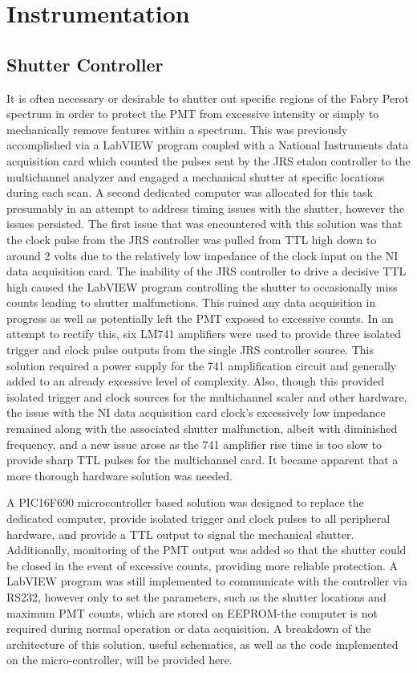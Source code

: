 \chapter{Instrumentation}
\section{Shutter Controller}\label{sec:Shutter}
It is often necessary or desirable to shutter out specific regions of the Fabry Perot spectrum in order to protect the PMT from excessive intensity or simply to mechanically remove features within a spectrum.  This was previously accomplished via a LabVIEW program coupled with a National Instruments data acquisition card which counted the pulses sent by the JRS etalon controller to the multichannel analyzer and engaged a mechanical shutter at specific locations during each scan.  A second dedicated computer was allocated for this task presumably in an attempt to address timing issues with the shutter, however the issues persisted.  The first issue that was encountered with this solution was that the clock pulse from the JRS controller was pulled from TTL high down to around 2 volts due to the relatively low impedance of the clock input on the NI data acquisition card.  The inability of the JRS controller to drive a decisive TTL high caused the LabVIEW program controlling the shutter to occasionally miss counts leading to shutter malfunctions.  This ruined any data acquisition in progress as well as potentially left the PMT exposed to excessive counts.  In an attempt to rectify this, six LM741 amplifiers were used to provide three isolated trigger and clock pulse outputs from the single JRS controller source.  This solution required a power supply for the 741 amplification circuit and generally added to an already excessive level of complexity.  Also, though this provided isolated trigger and clock sources for the multichannel scaler and other hardware, the issue with the NI data acquisition card clock's excessively low impedance remained along with the associated shutter malfunction, albeit with diminished frequency, and a new issue arose as the 741 amplifier rise time is too slow to provide sharp TTL pulses for the multichannel card.   It became apparent that a more thorough hardware solution was needed. 

A PIC16F690 microcontroller based solution was designed to replace the dedicated computer, provide isolated trigger and clock pulses to all peripheral hardware, and provide a TTL output to signal the mechanical shutter.  Additionally, monitoring of the PMT output was added so that the shutter could be closed in the event of excessive counts, providing more reliable protection.  A LabVIEW program was still implemented to communicate with the controller via RS232, however only to set the parameters, such as the shutter locations and maximum PMT counts, which are stored on EEPROM\--the computer is not required during normal operation or data acquisition.  A breakdown of the architecture of this solution, useful schematics, as well as the code implemented on the micro-controller, will be provided here.

